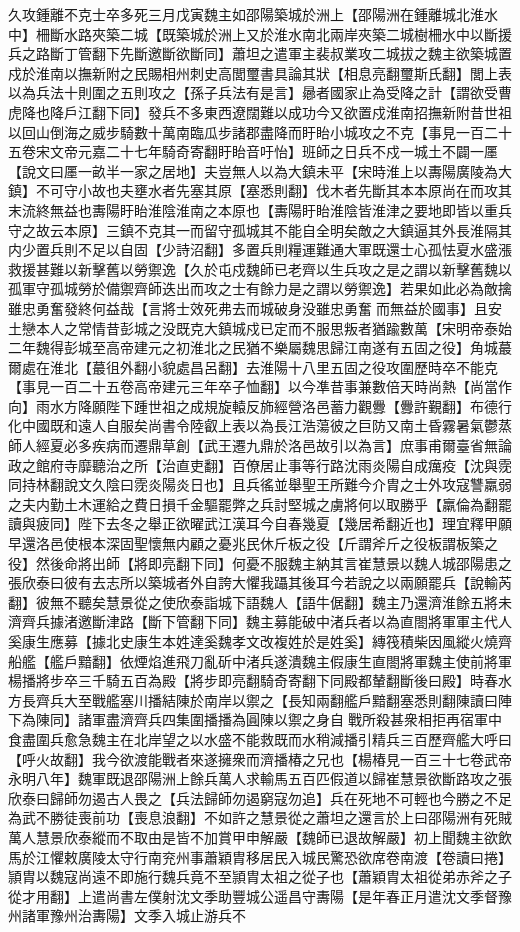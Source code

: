 久攻鍾離不克士卒多死三月戊寅魏主如邵陽築城於洲上【邵陽洲在鍾離城北淮水中】柵斷水路夾築二城【既築城於洲上又於淮水南北兩岸夾築二城樹柵水中以斷援兵之路斷丁管翻下先斷邀斷欲斷同】蕭坦之遣軍主裴叔業攻二城拔之魏主欲築城置戍於淮南以撫新附之民賜相州刺史高閭璽書具論其狀【相息亮翻璽斯氏翻】閭上表以為兵法十則圍之五則攻之【孫子兵法有是言】曏者國家止為受降之計【謂欲受曹虎降也降戶江翻下同】發兵不多東西遼闊難以成功今又欲置戍淮南招撫新附昔世祖以回山倒海之威步騎數十萬南臨瓜步諸郡盡降而盱眙小城攻之不克【事見一百二十五卷宋文帝元嘉二十七年騎奇寄翻盱眙音吁怡】班師之日兵不戍一城土不闢一㕓【說文曰㕓一畝半一家之居地】夫豈無人以為大鎮未平【宋時淮上以夀陽廣陵為大鎮】不可守小故也夫壅水者先塞其原【塞悉則翻】伐木者先斷其本本原尚在而攻其末流終無益也夀陽盱眙淮陰淮南之本原也【夀陽盱眙淮陰皆淮津之要地即皆以重兵守之故云本原】三鎮不克其一而留守孤城其不能自全明矣敵之大鎮逼其外長淮隔其内少置兵則不足以自固【少詩沼翻】多置兵則糧運難通大軍既還士心孤怯夏水盛漲救援甚難以新擊舊以勞禦逸【久於屯戍魏師已老齊以生兵攻之是之謂以新擊舊魏以孤軍守孤城勞於備禦齊師迭出而攻之士有餘力是之謂以勞禦逸】若果如此必為敵擒雖忠勇奮發終何益哉【言將士效死弗去而城破身没雖忠勇奮而無益於國事】且安土戀本人之常情昔彭城之没既克大鎮城戍已定而不服思叛者猶踰數萬【宋明帝泰始二年魏得彭城至高帝建元之初淮北之民猶不樂屬魏思歸江南遂有五固之役】角城蕞爾處在淮北【蕞徂外翻小貌處昌呂翻】去淮陽十八里五固之役攻圍歷時卒不能克【事見一百二十五卷高帝建元三年卒子恤翻】以今凖昔事兼數倍天時尚熱【尚當作向】雨水方降願陛下踵世祖之成規旋轅反斾經營洛邑蓄力觀釁【釁許覲翻】布德行化中國既和遠人自服矣尚書令陸叡上表以為長江浩蕩彼之巨防又南土昏霧暑氣鬱蒸師人經夏必多疾病而遷鼎草創【武王遷九鼎於洛邑故引以為言】庶事甫爾臺省無論政之館府寺靡聽治之所【治直吏翻】百僚居止事等行路沈雨炎陽自成癘疫【沈與霃同持林翻說文久陰曰霃炎陽炎日也】且兵徭並舉聖王所難今介胄之士外攻寇讐羸弱之夫内勤土木運給之費日損千金驅罷弊之兵討堅城之虜將何以取勝乎【羸倫為翻罷讀與疲同】陛下去冬之舉正欲曜武江漢耳今自春幾夏【幾居希翻近也】理宜釋甲願早還洛邑使根本深固聖懷無内顧之憂兆民休斤板之役【斤謂斧斤之役板謂板築之役】然後命將出師【將即亮翻下同】何憂不服魏主納其言崔慧景以魏人城邵陽患之張欣泰曰彼有去志所以築城者外自誇大懼我躡其後耳今若說之以兩願罷兵【說輸芮翻】彼無不聽矣慧景從之使欣泰詣城下語魏人【語牛倨翻】魏主乃還濟淮餘五將未濟齊兵據渚邀斷津路【斷下管翻下同】魏主募能破中渚兵者以為直閤將軍軍主代人奚康生應募【據北史康生本姓達奚魏孝文改複姓於是姓奚】縳筏積柴因風縱火燒齊船艦【艦戶黯翻】依煙焰進飛刀亂斫中渚兵遂潰魏主假康生直閤將軍魏主使前將軍楊播將步卒三千騎五百為殿【將步即亮翻騎奇寄翻下同殿都輦翻斷後曰殿】時春水方長齊兵大至戰艦塞川播結陳於南岸以禦之【長知兩翻艦戶黯翻塞悉則翻陳讀曰陣下為陳同】諸軍盡濟齊兵四集圍播播為圓陳以禦之身自戰所殺甚衆相拒再宿軍中食盡圍兵愈急魏主在北岸望之以水盛不能救既而水稍減播引精兵三百歷齊艦大呼曰【呼火故翻】我今欲渡能戰者來遂擁衆而濟播椿之兄也【楊椿見一百三十七卷武帝永明八年】魏軍既退邵陽洲上餘兵萬人求輸馬五百匹假道以歸崔慧景欲斷路攻之張欣泰曰歸師勿遏古人畏之【兵法歸師勿遏窮寇勿追】兵在死地不可輕也今勝之不足為武不勝徒喪前功【喪息浪翻】不如許之慧景從之蕭坦之還言於上曰邵陽洲有死賊萬人慧景欣泰縱而不取由是皆不加賞甲申解嚴【魏師已退故解嚴】初上聞魏主欲飲馬於江懼敕廣陵太守行南兖州事蕭穎胄移居民入城民驚恐欲席卷南渡【卷讀曰捲】頴胄以魏寇尚遠不即施行魏兵竟不至頴胄太祖之從子也【蕭穎胄太祖從弟赤斧之子從才用翻】上遣尚書左僕射沈文季助豐城公遥昌守夀陽【是年春正月遣沈文季督豫州諸軍豫州治夀陽】文季入城止游兵不
